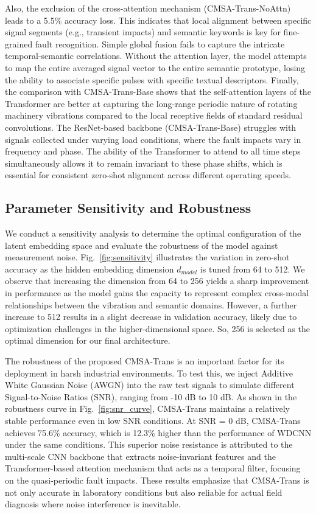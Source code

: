 {Also, the exclusion of the cross-attention mechanism (CMSA-Trans-NoAttn) leads to a 5.5\% accuracy loss. This indicates that local alignment between specific signal segments (e.g., transient impacts) and semantic keywords is key for fine-grained fault recognition. Simple global fusion fails to capture the intricate temporal-semantic correlations. Without the attention layer, the model attempts to map the entire averaged signal vector to the entire semantic prototype, losing the ability to associate specific pulses with specific textual descriptors. Finally, the comparison with CMSA-Trans-Base shows that the self-attention layers of the Transformer are better at capturing the long-range periodic nature of rotating machinery vibrations compared to the local receptive fields of standard residual convolutions. The ResNet-based backbone (CMSA-Trans-Base) struggles with signals collected under varying load conditions, where the fault impacts vary in frequency and phase. The ability of the Transformer to attend to all time steps simultaneously allows it to remain invariant to these phase shifts, which is essential for consistent zero-shot alignment across different operating speeds.

\subsection{Parameter Sensitivity and Robustness}
We conduct a sensitivity analysis to determine the optimal configuration of the latent embedding space and evaluate the robustness of the model against measurement noise. Fig.~\ref{fig:sensitivity} illustrates the variation in zero-shot accuracy as the hidden embedding dimension $d_{model}$ is tuned from 64 to 512. We observe that increasing the dimension from 64 to 256 yields a sharp improvement in performance as the model gains the capacity to represent complex cross-modal relationships between the vibration and semantic domains. However, a further increase to 512 results in a slight decrease in validation accuracy, likely due to optimization challenges in the higher-dimensional space. So, 256 is selected as the optimal dimension for our final architecture.

The robustness of the proposed CMSA-Trans is an important factor for its deployment in harsh industrial environments. To test this, we inject Additive White Gaussian Noise (AWGN) into the raw test signals to simulate different Signal-to-Noise Ratios (SNR), ranging from -10 dB to 10 dB. As shown in the robustness curve in Fig.~\ref{fig:snr_curve}, CMSA-Trans maintains a relatively stable performance even in low SNR conditions. At SNR = 0 dB, CMSA-Trans achieves 75.6\% accuracy, which is 12.3\% higher than the performance of WDCNN under the same conditions. This superior noise resistance is attributed to the multi-scale CNN backbone that extracts noise-invariant features and the Transformer-based attention mechanism that acts as a temporal filter, focusing on the quasi-periodic fault impacts. These results emphasize that CMSA-Trans is not only accurate in laboratory conditions but also reliable for actual field diagnosis where noise interference is inevitable.

}
